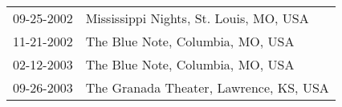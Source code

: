 \begin{supertabular}{ll}
 09-25-2002 &  Mississippi Nights, St. Louis, MO, USA \\
 11-21-2002 &        The Blue Note, Columbia, MO, USA \\
 02-12-2003 &        The Blue Note, Columbia, MO, USA \\
 09-26-2003 &  The Granada Theater, Lawrence, KS, USA \\
\end{supertabular}
